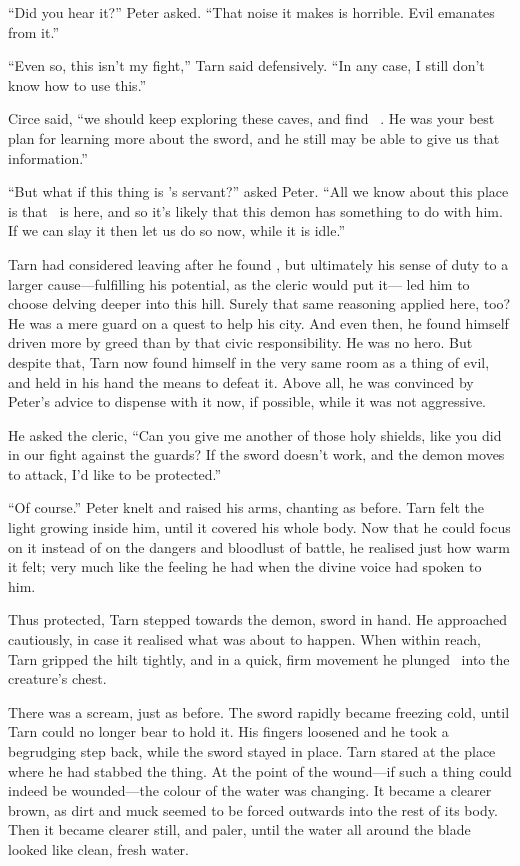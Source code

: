``Did you hear it?''  Peter asked.  ``That noise it makes is horrible.  Evil emanates from it.''

``Even so, this isn't my fight,'' Tarn said defensively.  ``In any case, I still don't know how to use this.''

Circe said, ``we should keep exploring these caves, and find \mothzam\ \driktur.  He was your best plan for learning more about the sword, and he still may be able to give us that information.''

``But what if this thing is \mothzam's servant?'' asked Peter.  ``All we know about this place is that \mothzam\ is here, and so it's likely that this demon has something to do with him.  If we can slay it then let us do so now, while it is idle.''

Tarn had considered leaving after he found \kildir, but ultimately his sense of duty to a larger cause---fulfilling his potential, as the cleric would put it--- led him to choose delving deeper into this hill.  Surely that same reasoning applied here, too?  He was a mere guard on a quest to help his city.  And even then, he found himself driven more by greed than by that civic responsibility. He was no hero. But despite that, Tarn now found himself in the very same room as a thing of evil, and held in his hand the means to defeat it.  Above all, he was convinced by Peter's advice to dispense with it now, if possible, while it was not aggressive.

He asked the cleric, ``Can you give me another of those holy shields, like you did in our fight against the guards?  If the sword doesn't work, and the demon moves to attack, I'd like to be protected.''

``Of course.''  Peter knelt and raised his arms, chanting as before.  Tarn felt the light growing inside him, until it covered his whole body.  Now that he could focus on it instead of on the dangers and bloodlust of battle, he realised just how warm it felt; very much like the feeling he had when the divine voice had spoken to him.

Thus protected, Tarn stepped towards the demon, sword in hand.  He approached cautiously, in case it realised what was about to happen.  When within reach, Tarn gripped the hilt tightly, and in a quick, firm movement he plunged \kildir\ into the creature's chest.

There was a scream, just as before.  The sword rapidly became freezing cold, until Tarn could no longer bear to hold it.  His fingers loosened and he took a begrudging step back, while the sword stayed in place.  Tarn stared at the place where he had stabbed the thing.  At the point of the wound---if such a thing could indeed be wounded---the colour of the water was changing.  It became a clearer brown, as dirt and muck seemed to be forced outwards into the rest of its body.  Then it became clearer still, and paler, until the water all around the blade looked like clean, fresh water.

